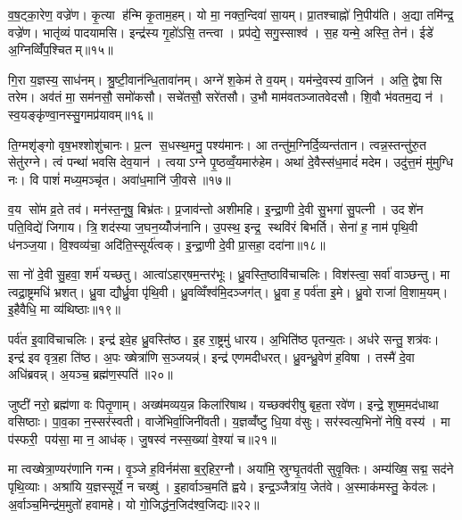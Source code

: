 व॒ष॒ट्का॒रेण॒ वज्रे॑ण। कृ॒त्या ह॑न्मि कृ॒ताम॒हम्। यो मा॒ नक्त॒न्दिवा॑ सा॒यम्। प्रा॒तश्चाह्नो॑ नि॒पीय॑ति। अ॒द्या तमि॑न्द्र॒ वज्रे॑ण। भातृ॑व्यं पादयामसि। इन्द्र॑स्य गृ॒हो॑ऽसि॒ तन्त्वा। प्रप॑द्ये॒ सगु॒स्साश्व॑। स॒ह यन्मे॒ अस्ति॒ तेन॑। ईडे॑ अ॒ग्निव्विँ॑प॒श्चितम्॥१५॥

गि॒रा य॒ज्ञस्य॒ साध॑नम्। श्रु॒ष्टी॒वान॑न्धि॒तावा॑नम्। अग्ने॑ श॒केम॑ ते व॒यम्। यम॑न्दे॒वस्य॑ वा॒जिन॑। अति॒ द्वेषासि तरेम। अव॑तं मा॒ सम॑नसौ॒ समो॑कसौ। सचे॑तसौ॒ सरे॑तसौ। उ॒भौ माम॑वतञ्जातवेदसौ। शि॒वौ भ॑वतम॒द्य न॑। स्व॒यङ्कृ॑ण्वा॒नस्सु॒गमप्र॑यावम्॥१६॥

ति॒ग्मशृ॑ङ्गो वृष॒भश्शोशु॑चानः। प्र॒त्न स॒धस्थ॒मनु॒ पश्य॑मानः। आ तन्तु॑म॒ग्निर्दि॒व्यन्त॑तान। त्वन्न॒स्तन्तु॑रु॒त सेतु॑रग्ने। त्वं पन्था॑ भवसि देव॒यान॑। त्वयाऽग्ने पृ॒ष्ठव्वँ॒यमारु॑हेम। अथा॑ दे॒वैस्स॑ध॒मादं॑ मदेम। उदु॑त्त॒मं मु॑मुग्धि नः। वि पाशं॑ मध्य॒मञ्चृ॑त। अवा॑ध॒मानि॑ जी॒वसे॥१७॥

व॒य सो॑म व्र॒ते तव॑। मन॑स्त॒नूषु॒ बिभ्र॑तः। प्र॒जाव॑न्तो अशीमहि। इ॒न्द्रा॒णी दे॒वी सु॒भगा॑ सु॒पत्नी। उदशे॑न पति॒विद्ये॑ जिगाय। त्रि॒शद॑स्या ज॒घन॒य्योँज॑नानि। उ॒पस्थ॒ इन्द्र॒ स्थवि॑रं बिभर्ति। सेना॑ ह॒ नाम॑ पृथि॒वी ध॑नञ्ज॒या। वि॒श्वव्य॑चा॒ अदि॑ति॒स्सूर्य॑त्वक्। इ॒न्द्रा॒णी दे॒वी प्रा॒सहा॒ ददा॑ना॥१८॥

सा नो॑ दे॒वी सु॒हवा॒ शर्म॑ यच्छतु। आत्वा॑ऽहार्‌षम॒न्तर॑भूः। ध्रु॒वस्ति॒ष्ठावि॑चाचलिः। विश॑स्त्वा॒ सर्वा॑ वाञ्छन्तु। मा त्वद्रा॒ष्ट्रमधि॑ भ्रशत्। ध्रु॒वा द्यौर्ध्रु॒वा पृ॑थि॒वी। ध्रु॒वव्विँश्व॑मि॒दञ्जग॑त्। ध्रु॒वा ह॒ पर्व॑ता इ॒मे। ध्रु॒वो राजा॑ वि॒शाम॒यम्। इ॒हैवैधि॒ मा व्य॑थिष्ठाः॥१९॥

पर्व॑त इ॒वावि॑चाचलिः। इन्द्र॑ इवे॒ह ध्रु॒वस्ति॑ष्ठ। इ॒ह रा॒ष्ट्रमु॑ धारय। अ॒भिति॑ष्ठ पृतन्य॒तः। अध॑रे सन्तु॒ शत्र॑वः। इन्द्र॑ इव वृत्र॒हा ति॑ष्ठ। अ॒पः ख्षेत्रा॑णि स॒ञ्जयन्न्॑। इन्द्र॑ एणमदीधरत्। ध्रु॒वन्ध्रु॒वेण॑ ह॒विषा। तस्मै॑ दे॒वा अधि॑ब्रवन्न्। अ॒यञ्च॒ ब्रह्म॑ण॒स्पति॑॥२०॥\anuvakamend[ह॒विर्भि॑रा॒स्य॑मभि॒ दास॑तो विप॒श्चित॒मप्र॑यावञ्जी॒वसे॒ ददा॑ना व्यथिष्ठा ब्रव॒न्नेक॑ञ्च]

जुष्टी॑ नरो॒ ब्रह्म॑णा वः पितृ॒णाम्। अख्ष॑मव्यय॒न्न किला॑रिषाथ। यच्छक्व॑रीषु बृह॒ता रवे॑ण। इन्द्रे॒ शुष्म॒मद॑धाथा वसिष्ठाः। पा॒व॒का न॒स्सर॑स्वती। वाजे॑भिर्वा॒जिनी॑वती। य॒ज्ञव्वँ॑ष्टु धि॒या व॑सुः। सर॑स्वत्य॒भिनो॑ नेषि॒ वस्य॑। मा प॑स्फरी॒ पय॑सा॒ मा न॒ आध॑क्। जु॒षस्व॑ नस्स॒ख्या॑ वे॒श्या॑ च॥२१॥

मा त्वख्षेत्रा॒ण्यर॑णानि गन्म। वृ॒ञ्जे ह॒विर्नम॑सा ब॒र्॒हिर॒ग्नौ। अया॑मि॒ स्रुग्घृ॒तव॑ती सुवृ॒क्तिः। अम्य॑ख्षि॒ सद्म॒ सद॑ने पृथि॒व्याः। अश्रा॑यि य॒ज्ञस्सूर्ये॒ न चख्षु॑। इ॒हार्वाञ्च॒मति॑ ह्वये। इन्द्र॒ञ्जैत्रा॑य॒ जेत॑वे। अ॒स्माक॑मस्तु॒ केव॑लः। अ॒र्वाञ्च॒मिन्द्र॑म॒मुतो॑ हवामहे। यो गो॒जिद्ध॑न॒जिद॑श्व॒जिद्यः॥२२॥

